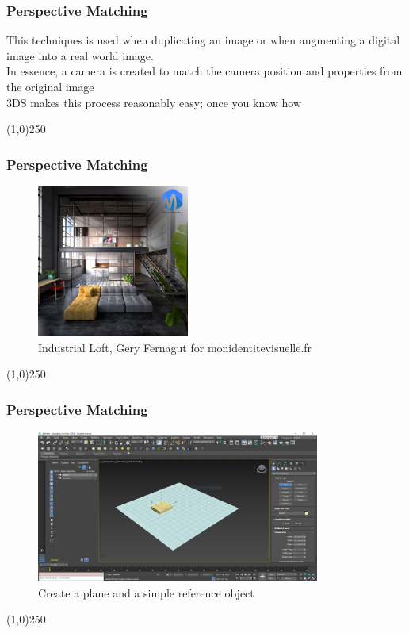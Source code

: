 \begin{frame}
	\frametitle{Perspective Matching}
	This techniques is used when duplicating an image or when augmenting a digital image into a real world image.\\
	In essence, a camera is created to match the camera position and properties from the original image\\
	3DS makes this process reasonably easy; once you know how
	
\end{frame}
\begin{center}\line(1,0){250}\end{center}


\begin{frame}
	\frametitle{Perspective Matching}
	\begin{figure}
		\centering
		\includegraphics[height=5cm]{./img/PerspectiveMatching/loft_large.jpg}
		\caption[Industrial Loft, Gery Fernagut for monidentitevisuelle.fr]{Industrial Loft, Gery Fernagut for monidentitevisuelle.fr}
		\label{fig:loftlarge}
	\end{figure}
	
\end{frame}
\begin{center}\line(1,0){250}\end{center}



\begin{frame}
	\frametitle{Perspective Matching}
	\begin{figure}
		\centering
		\includegraphics[height=5cm]{./img/PerspectiveMatching/1.jpg}
		\caption[Create a plane and a simple reference object]{Create a plane and a simple reference object}
		\label{fig:PerspectiveMatch1}
	\end{figure}
\end{frame}
\begin{center}\line(1,0){250}\end{center}


